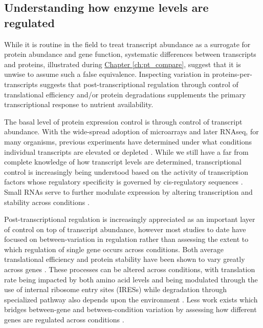 \subsection{Understanding how enzyme levels are regulated}

While it is routine in the field to treat transcript abundance as a surrogate for protein abundance and gene function, systematic differences between transcripts and proteins, illustrated during \hyperref[ch:pt_compare]{Chapter \ref{ch:pt_compare}}, suggest that it is unwise to assume such a false equivalence. Inspecting variation in proteins-per-transcripts suggests that post-transcriptional regulation through control of translational efficiency and/or protein degradations supplements the primary transcriptional response to nutrient availability. 

The basal level of protein expression control is through control of transcript abundance.  With the wide-spread adoption of microarrays and later RNAseq, for many organisms, previous experiments have determined under what conditions individual transcripts are elevated or depleted \cite{Edgar:2002tt}. While we still have a far from complete knowledge of how transcript levels are determined, transcriptional control is increasingly being understood based on the activity of transcription factors whose regulatory specificity is governed by cis-regulatory sequences \cite{Boorsma:2008cv, McIsaac:2012da}. Small RNAs serve to further modulate expression by altering transcription and stability across conditions \cite{ValenciaSanchez:2006eb, Guo:2010tv}.

Post-transcriptional regulation is increasingly appreciated as an important layer of control on top of transcript abundance, however most studies to date have focused on between-variation in regulation rather than assessing the extent to which regulation of single gene occurs across conditions. Both average translational efficiency and protein stability have been shown to vary greatly across genes \cite{Belle:2006hv, Ingolia:2011hu}. These processes can be altered across conditions, with translation rate being impacted by both amino acid levels \cite{Klumpp:2009ic} and being modulated through the use of internal ribosome entry sites (IRESs) \cite{Hellen:2001cw} while degradation through specialized pathway also depends upon the environment \cite{Callis:1995ki}. Less work exists which bridges between-gene and between-condition variation by assessing how different genes are regulated across conditions \cite{Brar:2012ig, Jovanovic:2015hp}. 

